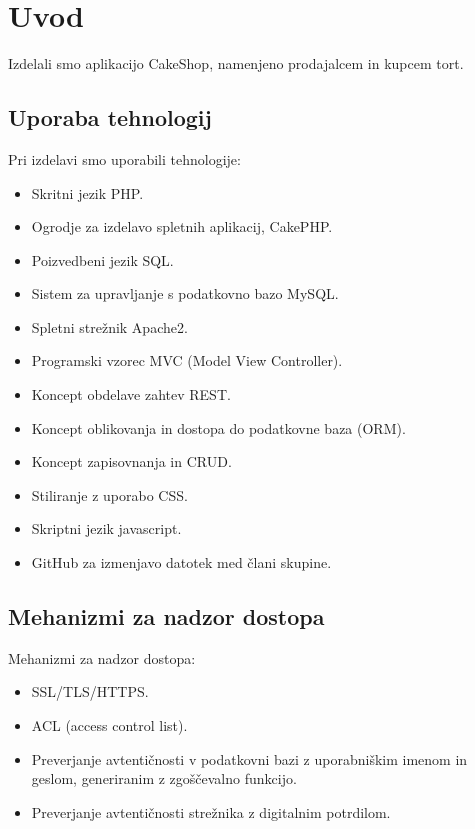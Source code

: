 \documentclass[a4paper,12pt]{report}
\begin{document}
\chapter{Uvod}


Izdelali smo aplikacijo CakeShop, namenjeno prodajalcem in kupcem tort.

\section{Uporaba tehnologij}

Pri izdelavi smo uporabili tehnologije:

\begin{itemize}
  \item Skritni jezik PHP.
  \item Ogrodje za izdelavo spletnih aplikacij, CakePHP.
  \item Poizvedbeni jezik SQL.
  \item Sistem za upravljanje s podatkovno bazo MySQL.
  \item Spletni strežnik Apache2.
  \item Programski vzorec MVC (Model View Controller).
  \item Koncept obdelave zahtev REST.
  \item Koncept oblikovanja in dostopa do podatkovne baza (ORM).
  \item Koncept zapisovnanja in CRUD.
  \item Stiliranje z uporabo CSS.
  \item Skriptni jezik javascript.
  \item GitHub za izmenjavo datotek med člani skupine.
\end{itemize}

\section{Mehanizmi za nadzor dostopa}

Mehanizmi za nadzor dostopa:
\begin{itemize}
  \item SSL/TLS/HTTPS.
  \item ACL (access control list).
  \item Preverjanje avtentičnosti v podatkovni bazi z uporabniškim imenom in geslom, generiranim z zgoščevalno funkcijo.
  \item Preverjanje avtentičnosti strežnika z digitalnim potrdilom.
\end{itemize}
\end{document}
